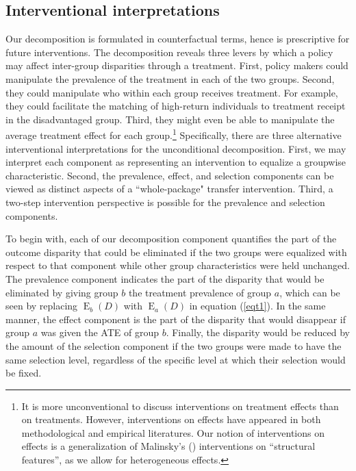 \documentclass[12pt,a4paper]{article}
\newcommand{\E}{\operatorname{E}}
\begin{document}
\subsection{Interventional interpretations}
Our decomposition is formulated in counterfactual terms, hence is prescriptive for future interventions. The decomposition reveals three levers by which a policy may affect inter-group disparities through a treatment. First, policy makers could manipulate the prevalence of the treatment in each of the two groups. Second, they could manipulate who within each group receives treatment. For example, they could facilitate the matching of high-return individuals to treatment receipt in the disadvantaged group. Third, they might even be able to manipulate the average treatment effect for each group.\footnote{It is more unconventional to discuss interventions on treatment effects than on treatments. However, interventions on effects have appeared in both methodological \citep{malinsky_intervening_2018} and empirical \citep{brady_rethinking_2017} literatures.
Our notion of interventions on effects is a generalization of Malinsky's (\citeyear{malinsky_intervening_2018}) interventions on ``structural features'', as we allow for heterogeneous effects.} Specifically, there are three alternative interventional interpretations for the unconditional decomposition. First, we may interpret each component as representing an intervention to equalize a groupwise characteristic. Second, the prevalence, effect, and selection components can be viewed as distinct aspects of a ``whole-package" transfer intervention. Third, a two-step intervention perspective is possible for the prevalence and selection components. 

To begin with, each of our decomposition component quantifies the part of the outcome disparity that could be eliminated if the two groups were equalized with respect to that component while other group characteristics were held unchanged.
The prevalence component indicates the part of the disparity that would be eliminated by giving group $b$ the treatment prevalence of group $a$, which can be seen by replacing $\E_b(D)$ with $\E_a(D)$ in equation (\ref{eqt1}). In the same manner, the effect component is the part of the disparity that would disappear if group $a$ was given the ATE of group $b$. Finally, the disparity would be reduced by the amount of the selection component if the two groups were made to have the same selection level, regardless of the specific level at which their selection would be fixed. 
\end{document}
